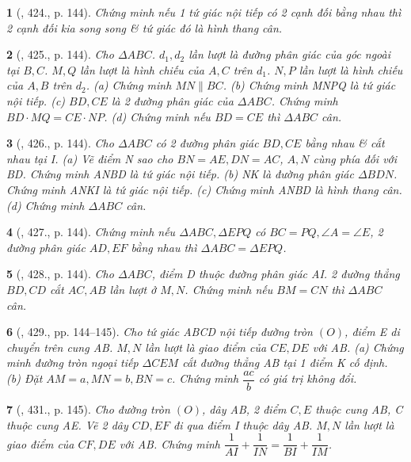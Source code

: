 \documentclass{article}
\newtheorem{baitoan}{}
\begin{document}
\begin{baitoan}[\cite{Binh_Toan_9_tap_2}, 424., p. 144]
	Chứng minh nếu 1 tứ giác nội tiếp có 2 cạnh đối bằng nhau thì 2 cạnh đối kia song song \& tứ giác đó là hình thang cân.
\end{baitoan}

\begin{baitoan}[\cite{Binh_Toan_9_tap_2}, 425., p. 144]
	Cho $\Delta ABC$. $d_1,d_2$ lần lượt là đường phân giác của góc ngoài tại $B,C$. $M,Q$ lần lượt là hình chiếu của $A,C$ trên $d_1$. $N,P$ lần lượt là hình chiếu của $A,B$ trên $d_2$. (a) Chứng minh $MN\parallel BC$. (b) Chứng minh MNPQ là tứ giác nội tiếp. (c) $BD,CE$ là 2 đường phân giác của $\Delta ABC$. Chứng minh $BD\cdot MQ = CE\cdot NP$. (d) Chứng minh nếu $BD = CE$ thì $\Delta ABC$ cân.
\end{baitoan}

\begin{baitoan}[\cite{Binh_Toan_9_tap_2}, 426., p. 144]
	Cho $\Delta ABC$ có 2 đường phân giác $BD,CE$ bằng nhau \& cắt nhau tại I. (a) Vẽ điểm N sao cho $BN = AE,DN = AC$, $A,N$ cùng phía đối với BD. Chứng minh ANBD là tứ giác nội tiếp. (b) NK là đường phân giác $\Delta BDN$. Chứng minh ANKI là tứ giác nội tiếp. (c) Chứng minh ANBD là hình thang cân. (d) Chứng minh $\Delta ABC$ cân.
\end{baitoan}

\begin{baitoan}[\cite{Binh_Toan_9_tap_2}, 427., p. 144]
	Chứng minh nếu $\Delta ABC,\Delta EPQ$ có $BC = PQ,\angle{A} = \angle{E}$, 2 đường phân giác $AD,EF$ bằng nhau thì $\Delta ABC = \Delta EPQ$.
\end{baitoan}

\begin{baitoan}[\cite{Binh_Toan_9_tap_2}, 428., p. 144]
	Cho $\Delta ABC$, điểm D thuộc đường phân giác AI. 2 đường thẳng $BD,CD$ cắt $AC,AB$ lần lượt ở $M,N$. Chứng minh nếu $BM = CN$ thì $\Delta ABC$ cân.
\end{baitoan}

\begin{baitoan}[\cite{Binh_Toan_9_tap_2}, 429., pp. 144--145]
	Cho tứ giác ABCD nội tiếp đường tròn $(O)$, điểm E di chuyển trên cung AB. $M,N$ lần lượt là giao điểm của $CE,DE$ với AB. (a) Chứng minh đường tròn ngoại tiếp $\Delta CEM$ cắt đường thẳng AB tại 1 điểm K cố định. (b) Đặt $AM = a,MN = b,BN = c$. Chứng minh $\dfrac{ac}{b}$ có giá trị không đổi.
\end{baitoan}

\begin{baitoan}[\cite{Binh_Toan_9_tap_2}, 431., p. 145]
	Cho đường tròn $(O)$, dây AB, 2 điểm $C,E$ thuộc cung AB, C thuộc cung AE. Vẽ 2 dây $CD,EF$ đi qua điểm I thuộc dây AB. $M,N$ lần lượt là giao điểm của $CF,DE$ với AB. Chứng minh $\dfrac{1}{AI} + \dfrac{1}{IN} = \dfrac{1}{BI} + \dfrac{1}{IM}$.
\end{baitoan}
\end{document}
